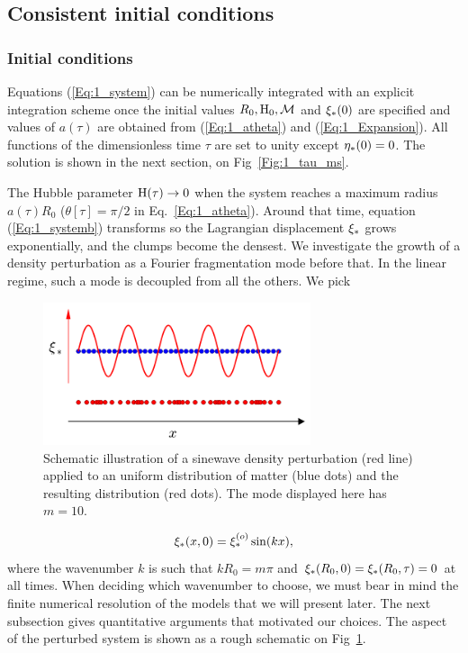 \subsection{Consistent initial conditions} 
\subsubsection{Initial conditions} 
Equations (\ref{Eq:1_system}) can be numerically integrated with an explicit integration scheme once the initial values $R_0, {\textrm{H}}_0, {\cal M}$ and $\xi_\ast(0)$ are specified and values of $a(\tau)$ are obtained from (\ref{Eq:1_atheta}) and (\ref{Eq:1_Expansion}). All functions of the dimensionless time $\tau$ are set to unity except $\eta_\ast(0) = 0$. The solution is shown in the next section,  on Fig~\ref{Fig:1_tau_ms}.


The Hubble parameter ${\textrm{H}}(\tau) \rightarrow 0$ when the system reaches a maximum radius $a(\tau)R_0$ ($\theta[\tau]=\pi/2$ in Eq.~\ref{Eq:1_atheta}). Around that time, equation (\ref{Eq:1_systemb}) transforms so the Lagrangian displacement $\xi_\ast$ grows exponentially, and the clumps become the densest. We investigate the growth of a density perturbation as a Fourier fragmentation mode before that. In the linear regime, such a mode is decoupled from all the others. We pick 

 \begin{figure}
	\center
 	\includegraphics[width=0.7\textwidth]{Figures/1_perturbation.png}
	\caption{Schematic illustration of a sinewave density perturbation (red line) applied to an uniform distribution of matter (blue dots) and the resulting distribution (red dots). The mode displayed here has $m=10$.} 
	\label{Fig:1_perturbation}
\end{figure}

\begin{equation} 
\label{Eq:1_FourierMode} 
   \xi_\ast(x,0) = \xi_\ast^{(o)} \sin( kx ) ,
\end{equation}  
where the wavenumber $k$ is such that $k R_0 = m \pi$ and $\xi_\ast(R_0,0) = \xi_\ast(R_0,\tau) = 0$ at all times. When deciding which wavenumber to choose, we must bear in mind the finite numerical resolution of the models that we will present later. The next subsection gives quantitative arguments that motivated our choices.  
The aspect of the perturbed system is shown as a rough schematic on Fig~\ref{Fig:1_perturbation}.

